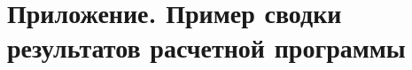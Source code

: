 \documentclass[a4paper,14pt]{extarticle}
\begin{document}









\section{Приложение. Пример сводки результатов расчетной программы}
\end{document}
